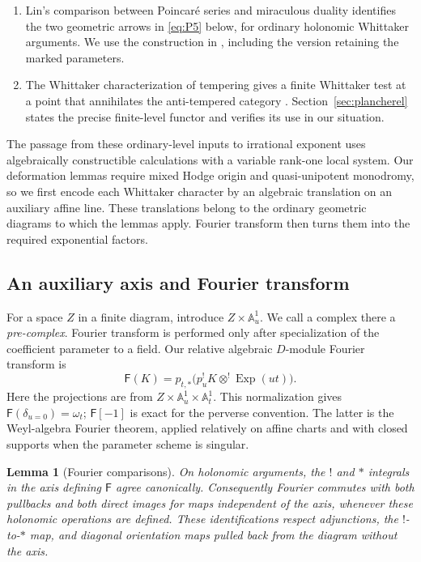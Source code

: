 \documentclass[11pt]{article}
\numberwithin{equation}{section}
\newtheorem{lemma}[theorem]{Lemma}
\theoremstyle{definition}
\theoremstyle{remark}
\begin{document}
\begin{enumerate}
\item Lin's comparison between Poincar\'e series and miraculous
duality identifies the two geometric arrows in
\eqref{eq:P5} below, for ordinary holonomic Whittaker arguments.
We use the construction in
\cite[Propositions~2.2.4--2.2.5, Section~2.2.6,
Section~8.1.3 and Proposition~8.1.4]{Lin}, including
the version retaining the marked parameters.

\item The Whittaker characterization of tempering gives a finite
Whittaker test at a point that annihilates the anti-tempered category
\cite{FaergemanRaskin}.  Section~\ref{sec:plancherel} states the
precise finite-level functor and verifies its use in our situation.
\end{enumerate}

The passage from these ordinary-level inputs to irrational exponent uses
algebraically constructible calculations with a variable rank-one local
system.  Our deformation lemmas require mixed Hodge origin and
quasi-unipotent monodromy, so we first encode each Whittaker character by
an algebraic translation on an auxiliary affine line.  These translations
belong to the ordinary geometric diagrams to which the lemmas apply.
Fourier transform then turns them into the required exponential factors.

\subsection{An auxiliary axis and Fourier transform}

For a space $Z$ in a finite diagram, introduce $Z\times\mathbb A^1_u$.
We call a complex there a \emph{pre-complex}.  Fourier transform is
performed only after specialization of the coefficient parameter to a
field.  Our relative algebraic $D$-module Fourier transform is
\[
 \mathsf F(K)=p_{t,*}\bigl(p_u^!K\mathbin{\otimes^!}
                                      \operatorname{Exp}(ut)\bigr).
\]
Here the projections are from $Z\times\mathbb A^1_u\times\mathbb A^1_t$.
This normalization gives $\mathsf F(\delta_{u=0})=\omega_t$;
$\mathsf F[-1]$ is exact for the perverse convention.  The latter is
the Weyl-algebra Fourier theorem, applied relatively on affine charts
and with closed supports when the parameter scheme is singular.

\begin{lemma}[Fourier comparisons]\label{deform:fourier}
On holonomic arguments, the $!$ and $*$ integrals in the axis defining
$\mathsf F$ agree canonically.  Consequently Fourier commutes with
both pullbacks and both direct images for maps independent of the
axis, whenever these holonomic operations are defined.  These
identifications respect adjunctions, the $!$-to-$*$ map, and diagonal
orientation maps pulled back from the diagram without the axis.
\end{lemma}
\end{document}
